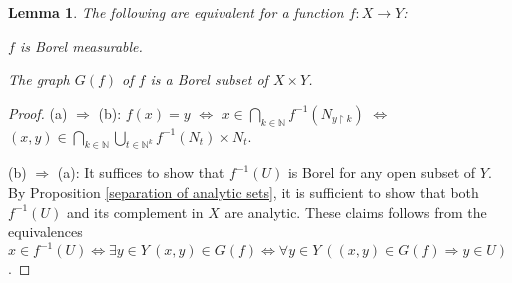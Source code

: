 \documentclass[10pt]{amsart}
\newcommand{\NN}{\mathbb{N}}
\newtheorem{lemma}[theorem]{Lemma}
\theoremstyle{definition}
\theoremstyle{remark}
\newenvironment{enumerate-(a)}{\begin{enumerate}[label={\upshape (\alph*)}, leftmargin=2pc]}{\end{enumerate}}
\begin{document}
\begin{lemma} 
The following are equivalent for a function $f\colon X\rightarrow Y$: 
\begin{enumerate-(a)} 
\item 
$f$ is Borel measurable. 
\item 
The graph $G(f)$ of $f$ is a Borel subset of $X\times Y$. 
\end{enumerate-(a)} 
\end{lemma} 
\begin{proof} 
(a) $\Rightarrow$ (b): $f(x)=y$ $\Longleftrightarrow$ $x\in \bigcap_{k\in \NN} f^{-1}(N_{y{\upharpoonright}k})$ $\Longleftrightarrow$ $(x,y)\in \bigcap_{k\in\NN} \bigcup_{t\in \NN^k} f^{-1}(N_t) \times N_t$. 

(b) $\Rightarrow$ (a): 
It suffices to show that $f^{-1}(U)$ is Borel for any open subset of $Y$. 
By Proposition \ref{separation of analytic sets}, it is sufficient to show that both $f^{-1}(U)$ and its complement in $X$ are analytic. 
These claims follows from the equivalences $x\in f^{-1}(U) \Longleftrightarrow \exists y\in Y\ (x,y)\in G(f) \Longleftrightarrow \forall y\in Y\ ((x,y)\in G(f)\Rightarrow y\in U)$. 
\end{proof} 








  
\end{document}
